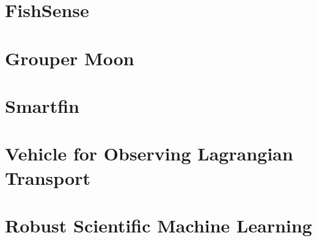 \section{FishSense}

\section{Grouper Moon}

\section{Smartfin}

\section{Vehicle for Observing Lagrangian Transport}

\section{Robust Scientific Machine Learning}

